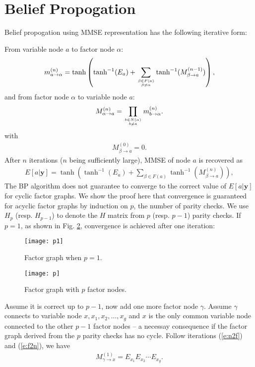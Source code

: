 \documentclass[conference]{IEEEtran}
\newcommand{\vect}[1]{\mathbf{#1}}
\begin{document}
\section{Belief Propogation}
Belief propogation using MMSE representation has the following iterative form:

From variable node $a$ to factor node $\alpha$:
\begin{align}
m_{a\rightarrow\alpha}^{(n)}=\tanh\left(\tanh^{-1}(E_a)+\sum_{\beta\in F(a)\atop \beta \neq \alpha}\tanh^{-1}(M_{\beta\rightarrow  a}^{(n-1)})\right), \label{e:n2f}
\end{align}
and from factor node $\alpha$ to variable node $a$:
\begin{align}
M_{\alpha\rightarrow a}^{(n)} = \prod_{b\in N(\alpha)\atop b \neq a}m_{b\rightarrow \alpha}^{(n)}. \label{e:f2n}
\end{align}
with
\begin{align}
M_{\beta\rightarrow a}^{(0)} = 0.
\end{align}
After $n$ iterations ($n$ being sufficiently large), MMSE of node $a$ is recovered as
\begin{align}
E[a|\vect{y}] = \tanh\left(\tanh^{-1}(E_a)+\sum_{\beta\in F(a)}\tanh^{-1}(M_{\beta\rightarrow  a}^{(n)})\right),
\end{align}
The BP algorithm does not guarantee to converge to the correct value of $E[a|\vect{y}]$ for cyclic factor graphs. We show the proof here that convergence is guaranteed for acyclic factor graphs by induction on $p$, the number of parity checks. We use $H_p$ (resp. $H_{p-1}$) to denote the $H$ matrix from $p$ (resp. $p-1$) parity checks. If $p=1$, as shown in Fig. \ref{f:p=1}, convergence is achieved after one iteration:
\begin{figure}[h]
\centering
\texttt{[image: p1]}
\caption{Factor graph when $p=1$.}
\label{f:p=1}
\end{figure}
\begin{figure}[h]
\centering
\texttt{[image: p]}
\caption{Factor graph with $p$ factor nodes.}
\label{f:p=1}
\end{figure}
Assume it is correct up to $p-1$, now add one more factor node $\gamma$. Assume $\gamma$ connects to variable node $x, x_1, x_2, \ldots, x_g$ and $x$ is the only common variable node connected to the other $p-1$ factor nodes -- a necessay consequence if the factor graph derived from the $p$ parity checks has no cycle. Follow iterations (\ref{e:n2f}) and (\ref{e:f2n}), we have
\begin{align*}
M_{\gamma\rightarrow x}^{(1)} = E_{x_1}E_{x_2}\cdots E_{x_g}.
\end{align*}
\end{document}
